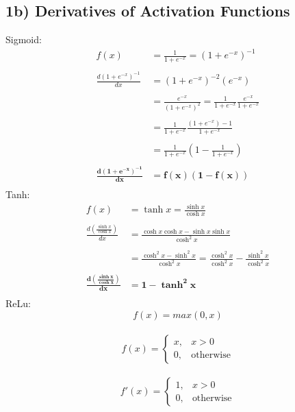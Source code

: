 \documentclass{article}
\begin{document}
\subsection*{1b) Derivatives of Activation Functions}
Sigmoid: 
	\begin{align*}
		f(x) &= \frac{1}{1+e^{-x}} = (1+e^{-x})^{-1}\\ \\
		\frac{d(1+e^{-x})^{-1}}{dx} &= (1+e^{-x})^{-2} (e^{-x})\\\\
		&=\frac{e^{-x}}{(1+e^{-x})^{2}} = \frac{1}{1+e^{-x}}\frac{e^{-x}}{1+e^{-x}}\\\\
		&=\frac{1}{1+e^{-x}}\frac{(1+e^{-x}) - 1}{1+e^{-x}}\\\\
		&= \frac{1}{1+e^{-x}}\left (1 - \frac{ 1}{1+e^{-x}}\right)\\\\
		\boldsymbol{\frac{d(1+e^{-x})^{-1}}{dx}} &\boldsymbol{= f(x)(1-f(x))}\\
	\end{align*}
Tanh:
	\begin{align*}
		f(x) &= \tanh{x} = \frac{\sinh{x}}{\cosh{x}}\\ \\
		\frac{d\left(\frac{\sinh{x}}{\cosh{x}}\right)}{dx}&= \frac{\cosh{x}\cosh{x} - \sinh{x}\sinh{x}}{\cosh^{2}{x}}\\\\
		&= \frac{\cosh^{2}{x}-\sinh^{2}{x}}{\cosh^{2}{x}} = \frac{\cosh^{2}{x}}{\cosh^{2}{x}} -  \frac{\sinh^{2}{x}}{\cosh^{2}{x}}\\\\
		\boldsymbol{\frac{d\left(\frac{\sinh{x}}{\cosh{x}}\right)}{dx}}& \boldsymbol{=1-\tanh^{2}{x}}\\
	\end{align*}
ReLu:
	\begin{equation*}
		f(x) = max(0,x)
	\end{equation*}
\\
	\[
		f(x) = 
			\begin{cases}
				x, & x> 0\\
				0, & \text {otherwise}
			\end{cases}
	\]
\\
	\[
		f'(x) = 
			\begin{cases}
				1, & x> 0\\
				0, & \text {otherwise}
			\end{cases}
	\]
\end{document}
